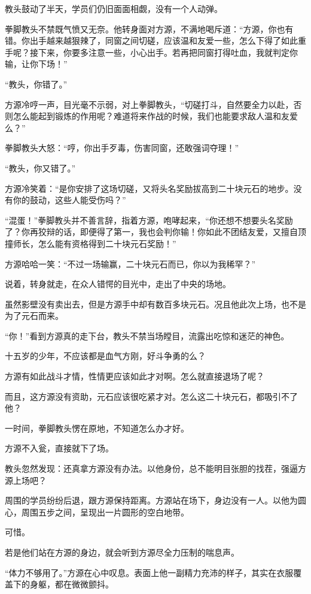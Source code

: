 \begin{this_body}
教头鼓动了半天，学员们仍旧面面相觑，没有一个人动弹。

拳脚教头不禁既气愤又无奈。他转身面对方源，不满地喝斥道：“方源，你也有错。你出手越来越狠辣了，同窗之间切磋，应该温和友爱一些，怎么下得了如此重手呢？接下来，你要多注意一些，小心出手。若再把同窗打得吐血，我就判定你输，让你下场！”

“教头，你错了。”

方源冷哼一声，目光毫不示弱，对上拳脚教头，“切磋打斗，自然要全力以赴，否则怎么能起到锻炼的作用呢？难道将来作战的时候，我们也能要求敌人温和友爱么？”

拳脚教头大怒：“哼，你出手歹毒，伤害同窗，还敢强词夺理！”

“教头，你又错了。”

方源冷笑着：“是你安排了这场切磋，又将头名奖励拔高到二十块元石的地步。没有你的鼓动，这些人能受伤吗？”

“混蛋！”拳脚教头并不善言辞，指着方源，咆哮起来，“你还想不想要头名奖励了？你再狡辩的话，即便得了第一，我也会判你输！你如此不团结友爱，又擅自顶撞师长，怎么能有资格得到二十块元石奖励！”

方源哈哈一笑：“不过一场输赢，二十块元石而已，你以为我稀罕？”

说着，转身就走，在众人错愕的目光中，走出了中央的场地。

虽然影壁没有卖出去，但是方源手中却有数百多块元石。况且他此次上场，也不是为了元石而来。

“你！”看到方源真的走下台，教头不禁当场瞠目，流露出吃惊和迷茫的神色。

十五岁的少年，不应该都是血气方刚，好斗争勇的么？

方源有如此战斗才情，性情更应该如此才对啊。怎么就直接退场了呢？

而且，这方源没有资助，元石应该很吃紧才对。怎么这二十块元石，都吸引不了他？

一时间，拳脚教头愣在原地，不知道怎么办才好。

方源不入瓮，直接就下了场。

教头忽然发现：还真拿方源没有办法。以他身份，总不能明目张胆的找茬，强逼方源上场吧？

周围的学员纷纷后退，跟方源保持距离。方源站在场下，身边没有一人。以他为圆心，周围五步之间，呈现出一片圆形的空白地带。

可惜。

若是他们站在方源的身边，就会听到方源尽全力压制的喘息声。

“体力不够用了。”方源在心中叹息。表面上他一副精力充沛的样子，其实在衣服覆盖下的身躯，都在微微颤抖。


\end{this_body}
